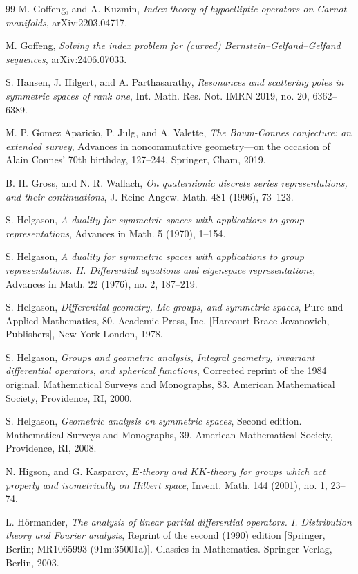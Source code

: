 \documentclass[a4paper,reqno]{amsart}
\numberwithin{equation}{section}
\theoremstyle{definition}
\theoremstyle{remark}
\begin{document}
\begin{thebibliography}{99}
 M. Goffeng, and A. Kuzmin, \emph{Index theory of hypoelliptic operators on Carnot manifolds}, arXiv:2203.04717.

 M. Goffeng, \emph{Solving the index problem for (curved) Bernstein--Gelfand--Gelfand sequences}, arXiv:2406.07033.

 S. Hansen, J. Hilgert, and A. Parthasarathy, \emph{Resonances and scattering poles in symmetric spaces of rank one}, Int. Math. Res. Not. IMRN 2019, no. 20, 6362--6389. 

 M. P. Gomez Aparicio, P. Julg, and A. Valette, \emph{The Baum-Connes conjecture: an extended survey}, Advances in noncommutative geometry—on the occasion of Alain Connes' 70th birthday, 127--244, Springer, Cham, 2019. 

 B. H. Gross, and N. R. Wallach, \emph{On quaternionic discrete series representations, and their continuations}, J. Reine Angew.
Math. 481 (1996), 73--123.

 S. Helgason, \emph{A duality for symmetric spaces with applications to group representations}, Advances in Math. 5 (1970), 1--154.

 S. Helgason, \emph{A duality for symmetric spaces with applications to group representations. II. Differential equations and eigenspace representations}, Advances in Math. 22 (1976), no. 2, 187--219. 


 S. Helgason, \emph{Differential geometry, Lie groups, and symmetric spaces}, Pure and Applied Mathematics, 80. Academic Press, Inc. [Harcourt Brace Jovanovich, Publishers], New York-London, 1978. 

 S. Helgason, \emph{Groups and geometric analysis, Integral geometry, invariant differential operators, and spherical functions}, Corrected reprint of the 1984 original. Mathematical Surveys and Monographs, 83. American Mathematical Society, Providence, RI, 2000.

 S. Helgason, \emph{Geometric analysis on symmetric spaces}, Second edition. Mathematical Surveys and Monographs, 39. American Mathematical Society, Providence, RI, 2008.

 N. Higson, and G. Kasparov, \emph{$E$-theory and $KK$-theory for groups which act properly and isometrically on Hilbert space}, Invent. Math. 144 (2001), no. 1, 23--74.

 L. Hörmander, \emph{The analysis of linear partial differential operators. I. Distribution theory and Fourier analysis}, Reprint of the second (1990) edition [Springer, Berlin; MR1065993 (91m:35001a)]. Classics in Mathematics. Springer-Verlag, Berlin, 2003.


\end{thebibliography}
\end{document}

